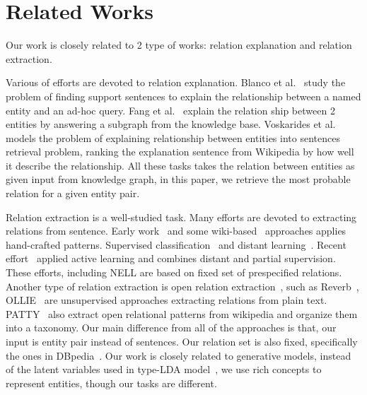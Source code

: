 \section{Related Works}
\label{sec:rel}

Our work is closely related to 2 type of works: relation explanation and relation extraction.

Various of efforts are devoted to relation explanation.
Blanco et al.~\cite{blanco2010finding} study the problem of finding support sentences to explain the relationship between a named entity and an ad-hoc query.
Fang et al.~\cite{fang2011rex} explain the relation ship between 2 entities by answering a subgraph from the knowledge base.
Voskarides et al.~\cite{voskarideslearning} models the problem of explaining relationship between entities into sentences retrieval problem, ranking the explanation sentence from Wikipedia by how well it describe the relationship.
All these tasks takes the relation between entities as given input from knowledge graph, in this paper, we retrieve the most probable relation for a given entity pair.

Relation extraction is a well-studied task.
Many efforts are devoted to extracting relations from sentence.
Early work~\cite{hearst1992automatic,brin1999extracting,agichtein2000snowball} and some wiki-based~\cite{ponzetto2008wikitaxonomy} approaches applies hand-crafted patterns.
Supervised classification~\cite{doddington2004automatic,guodong2005exploring} and distant learning~\cite{craven1999constructing,wu2007autonomously,bunescu2007learning,mintz2009distant}.
Recent effort~\cite{angeli2014combining} applied active learning and combines distant and partial supervision.
These efforts, including NELL are based on  fixed set of prespecified relations.
Another type of relation extraction is open relation extraction~\cite{banko2007open}, such as Reverb~\cite{fader2011identifying}, OLLIE~\cite{schmitz2012open} are unsupervised approaches extracting relations from plain text.
PATTY~\cite{nakashole2012patty} also extract open relational patterns from wikipedia and organize them into a taxonomy.
Our main difference from all of the approaches is that, our input is entity pair instead of sentences.
Our relation set is also fixed, specifically the ones in DBpedia~\cite{auer2007dbpedia}.
Our work is closely related to generative models, instead of the latent variables used in type-LDA model~\cite{yao2011structured}, we use rich concepts to represent entities, though our tasks are different.



